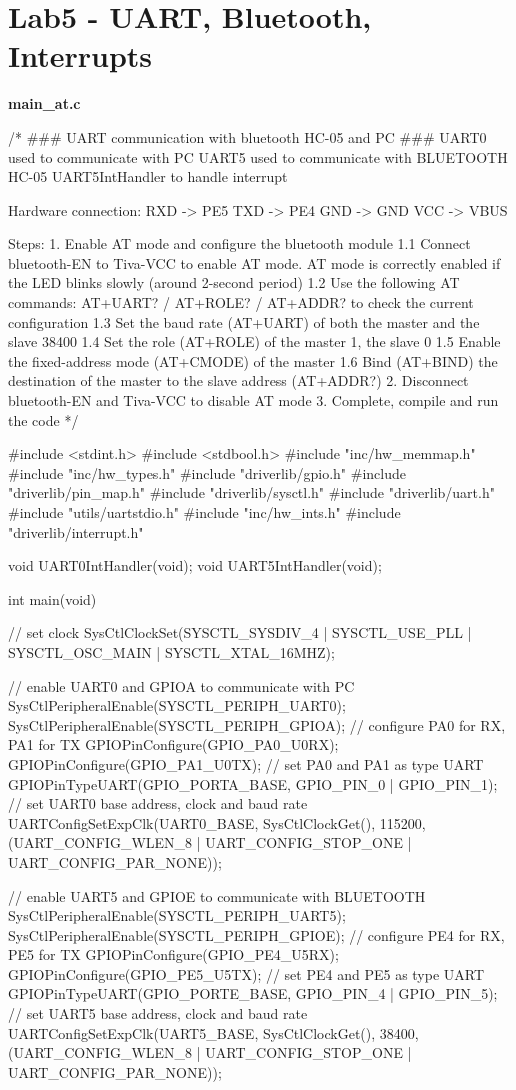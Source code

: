 \documentclass[12pt, a4paper]{article}
\begin{document}
\section{Lab5 - UART, Bluetooth, Interrupts}
\textbf{main\_at.c}
\begin{code}
/*
### UART communication with bluetooth HC-05 and PC ###
UART0 used to communicate with PC
UART5 used to communicate with BLUETOOTH HC-05
UART5IntHandler to handle interrupt

Hardware connection:
RXD -> PE5
TXD -> PE4
GND -> GND
VCC -> VBUS

Steps:
1. Enable AT mode and configure the bluetooth module
    1.1 Connect bluetooth-EN to Tiva-VCC to enable AT mode. AT mode is correctly enabled if the LED blinks slowly (around 2-second period)
    1.2 Use the following AT commands: AT+UART? / AT+ROLE? / AT+ADDR? to check the current configuration
    1.3 Set the baud rate (AT+UART) of both the master and the slave 38400
    1.4 Set the role (AT+ROLE) of the master 1, the slave 0
    1.5 Enable the fixed-address mode (AT+CMODE) of the master
    1.6 Bind (AT+BIND) the destination of the master to the slave address (AT+ADDR?)
2. Disconnect bluetooth-EN and Tiva-VCC to disable AT mode
3. Complete, compile and run the code
*/

#include <stdint.h>
#include <stdbool.h>
#include "inc/hw_memmap.h"
#include "inc/hw_types.h"
#include "driverlib/gpio.h"
#include "driverlib/pin_map.h"
#include "driverlib/sysctl.h"
#include "driverlib/uart.h"
#include "utils/uartstdio.h"
#include "inc/hw_ints.h"
#include "driverlib/interrupt.h"

void UART0IntHandler(void);
void UART5IntHandler(void);

int main(void) {
    // set clock
    SysCtlClockSet(SYSCTL_SYSDIV_4 | SYSCTL_USE_PLL | SYSCTL_OSC_MAIN | SYSCTL_XTAL_16MHZ);

    // enable UART0 and GPIOA to communicate with PC
    SysCtlPeripheralEnable(SYSCTL_PERIPH_UART0);
    SysCtlPeripheralEnable(SYSCTL_PERIPH_GPIOA);
    // configure PA0 for RX, PA1 for TX
    GPIOPinConfigure(GPIO_PA0_U0RX);
    GPIOPinConfigure(GPIO_PA1_U0TX);
    // set PA0 and PA1 as type UART
    GPIOPinTypeUART(GPIO_PORTA_BASE, GPIO_PIN_0 | GPIO_PIN_1);
    // set UART0 base address, clock and baud rate
    UARTConfigSetExpClk(UART0_BASE, SysCtlClockGet(), 115200,
        (UART_CONFIG_WLEN_8 | UART_CONFIG_STOP_ONE | UART_CONFIG_PAR_NONE));

    // enable UART5 and GPIOE to communicate with BLUETOOTH
    SysCtlPeripheralEnable(SYSCTL_PERIPH_UART5);
    SysCtlPeripheralEnable(SYSCTL_PERIPH_GPIOE);
    // configure PE4 for RX, PE5 for TX
    GPIOPinConfigure(GPIO_PE4_U5RX);
    GPIOPinConfigure(GPIO_PE5_U5TX);
    // set PE4 and PE5 as type UART
    GPIOPinTypeUART(GPIO_PORTE_BASE, GPIO_PIN_4 | GPIO_PIN_5);
    // set UART5 base address, clock and baud rate
    UARTConfigSetExpClk(UART5_BASE, SysCtlClockGet(), 38400,
        (UART_CONFIG_WLEN_8 | UART_CONFIG_STOP_ONE | UART_CONFIG_PAR_NONE));

}
\end{code}
\end{document}
